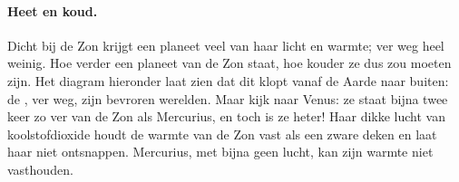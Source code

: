 \paragraph{Heet en koud.} Dicht bij de Zon krijgt een planeet veel van haar
licht en warmte; ver weg heel weinig. Hoe verder een planeet van de Zon
staat, hoe kouder ze dus zou moeten zijn. Het diagram hieronder laat zien
dat dit klopt vanaf de Aarde naar buiten: de , ver weg, zijn
bevroren werelden. Maar kijk naar Venus: ze staat bijna twee keer zo ver
van de Zon als Mercurius, en toch is ze heter! Haar dikke lucht van
koolstofdioxide houdt de warmte van de Zon vast als een zware deken en
laat haar niet ontsnappen. Mercurius, met bijna geen lucht, kan zijn
warmte niet vasthouden.

